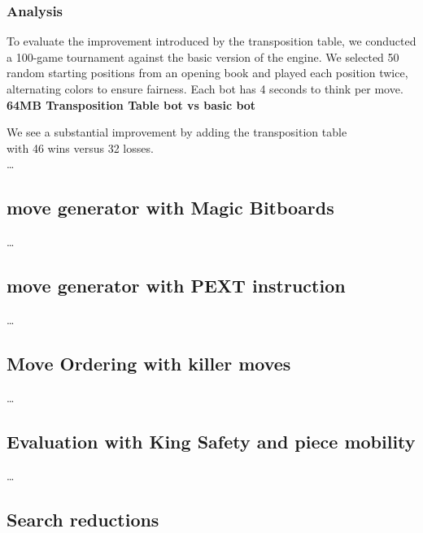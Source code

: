 \subsubsection{Analysis}

To evaluate the improvement introduced by the transposition table, we conducted\\
a 100-game tournament against the basic version of the engine. We selected 50\\
random starting positions from an opening book and played each position twice,\\
alternating colors to ensure fairness. Each bot has 4 seconds to think per move.\\

\textbf{64MB Transposition Table bot vs basic bot}\\
\medskip

We see a substantial improvement by adding the transposition table\\
with 46 wins versus 32 losses.\\

\ldots

\subsection{move generator with Magic Bitboards}

\ldots

\subsection{move generator with PEXT instruction}

\ldots

\subsection{Move Ordering with killer moves}

\ldots

\subsection{Evaluation with King Safety and piece mobility}

\ldots

\subsection{Search reductions}

